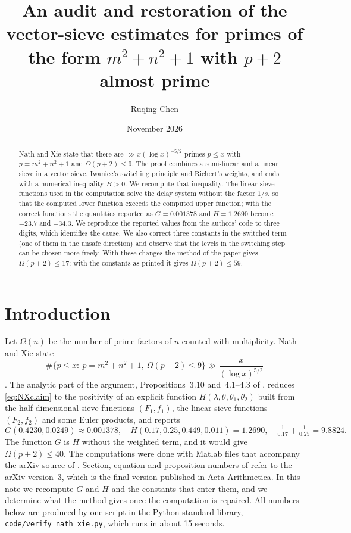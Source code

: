 \documentclass[11pt,a4paper]{amsart}
\title[Vector-sieve estimates for $p=m^2+n^2+1$]{An audit and restoration of the vector-sieve estimates for primes
of the form $m^2+n^2+1$ with $p+2$ almost prime}
\author{Ruqing Chen}
\date{November 2026}
\theoremstyle{remark}
\numberwithin{equation}{section}
\begin{document}
\begin{abstract}
Nath and Xie state that there are $\gg x(\log x)^{-5/2}$ primes $p\le x$ with $p=m^2+n^2+1$ and $\Omega(p+2)\le9$.
The proof combines a semi-linear and a linear sieve in a vector sieve, Iwaniec's switching principle and Richert's
weights, and ends with a numerical inequality $H>0$. We recompute that inequality. The linear sieve functions used in
the computation solve the delay system without the factor $1/s$, so that the computed lower function exceeds the
computed upper function; with the correct functions the quantities reported as $G=0.001378$ and $H=1.2690$ become
$-23.7$ and $-34.3$. We reproduce the reported values from the authors' code to three digits, which identifies the
cause. We also correct three constants in the switched term (one of them in the unsafe direction) and observe that the
levels in the switching step can be chosen more freely. With these changes the method of the paper gives
$\Omega(p+2)\le17$; with the constants as printed it gives $\Omega(p+2)\le59$.
\end{abstract}

\maketitle

\section{Introduction}\label{sec:intro}

Let $\Omega(n)$ be the number of prime factors of $n$ counted with multiplicity. Nath and Xie \cite{NX} state
\begin{equation}\label{eq:NXclaim}
\#\{p\le x:\ p=m^2+n^2+1,\ \Omega(p+2)\le 9\}\gg\frac{x}{(\log x)^{5/2}}
\end{equation}
\cite[Theorem~1.1]{NX}. The analytic part of the argument, Propositions~3.10 and~4.1--4.3 of \cite{NX}, reduces
\eqref{eq:NXclaim} to the positivity of an explicit function $H(\lambda,\theta,\theta_1,\theta_2)$ built from the
half-dimensional sieve functions $(F_1,f_1)$, the linear sieve functions $(F_2,f_2)$ and some Euler products, and
\cite[\S5]{NX} reports
\[
G(0.4230,0.0249)\approx0.001378,\quad H(0.17,0.25,0.449,0.011)=1.2690,\quad \tfrac1{0.17}+\tfrac1{0.25}=9.8824 .
\]
The function $G$ is $H$ without the weighted term, and it would give $\Omega(p+2)\le40$. The computations were
done with Matlab files that accompany the arXiv source of \cite{NX}. Section, equation and proposition numbers of
\cite{NX} refer to the arXiv version~3, which is the final version published in Acta Arithmetica. In this note we recompute $G$ and $H$ and the
constants that enter them, and we determine what the method gives once the computation is repaired. All numbers below
are produced by one script in the Python standard library, \texttt{code/verify\_nath\_xie.py}, which runs in about
15 seconds.
\end{document}
